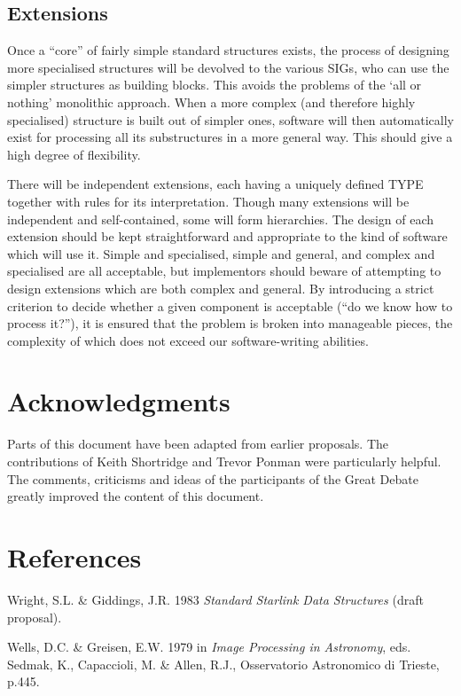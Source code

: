\documentclass[twoside,11pt,nolof,noabs]{starlink}
\begin{document}
\subsection{Extensions}
Once a ``core'' of fairly simple standard structures exists, the
process of designing more specialised structures will be devolved to
the various SIGs, who can use the simpler structures as building
blocks.  This avoids the problems of the `all or nothing'
monolithic approach.  When a more complex (and therefore
highly specialised) structure is built out of simpler ones, software
will then automatically exist for processing all its substructures in
a more general way. This should give a high degree of flexibility.

There will be independent extensions, each
having a uniquely defined TYPE together with rules for its
interpretation.
Though many extensions will be independent and self-contained,
some will form hierarchies.
The design of each extension should be kept straightforward
and appropriate to the kind of software which will use it.
Simple and specialised,
simple and general, and
complex and specialised are all acceptable,
but implementors should beware of attempting to
design extensions which are both complex and general.  By
introducing a strict criterion to decide whether a given component is
acceptable (``do we know how to process it?''), it is ensured that the
problem is broken into manageable
pieces, the complexity of which does not exceed our software-writing
abilities.

\section{Acknowledgments}
\label{se:acknow}

Parts of this document have been adapted from earlier proposals. The
contributions of Keith Shortridge and Trevor Ponman
were particularly helpful.  The comments, criticisms and ideas of the
participants of the Great Debate greatly improved the
content of this document.

\section{References}
\label{se:refs}


Wright, S.L. \& Giddings, J.R.  1983 \textit{Standard Starlink Data
Structures} (draft proposal).

Wells, D.C. \& Greisen, E.W.  1979 in \textit{Image Processing in Astronomy},
eds. Sedmak, K., Capaccioli, M. \& Allen, R.J., Osservatorio Astronomico
di Trieste, p.445.
\end{document}
